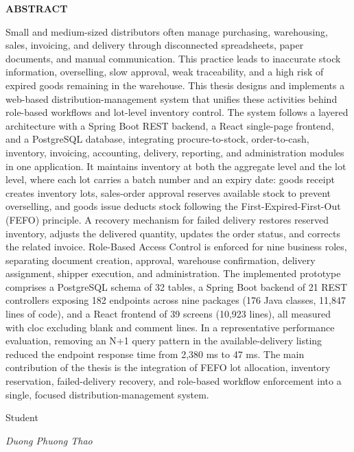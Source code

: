 \begin{center}\textbf{\large ABSTRACT}\end{center}


\noindent Small and medium-sized distributors often manage purchasing,
warehousing, sales, invoicing, and delivery through disconnected spreadsheets,
paper documents, and manual communication. This practice leads to inaccurate
stock information, overselling, slow approval, weak traceability, and a high
risk of expired goods remaining in the warehouse. This thesis designs and
implements a web-based distribution-management system that unifies these
activities behind role-based workflows and lot-level inventory control. The
system follows a layered architecture with a Spring Boot REST backend, a React
single-page frontend, and a PostgreSQL database, integrating procure-to-stock,
order-to-cash, inventory, invoicing, accounting, delivery, reporting, and
administration modules in one application. It maintains inventory at both the
aggregate level and the lot level, where each lot carries a batch number and an
expiry date: goods receipt creates inventory lots, sales-order approval reserves
available stock to prevent overselling, and goods issue deducts stock following
the First-Expired-First-Out (FEFO) principle. A recovery mechanism for failed
delivery restores reserved inventory, adjusts the delivered quantity, updates
the order status, and corrects the related invoice. Role-Based Access Control is
enforced for nine business roles, separating document creation, approval,
warehouse confirmation, delivery assignment, shipper execution, and
administration. The implemented prototype comprises a PostgreSQL schema of 32
tables, a Spring Boot backend of 21 REST controllers exposing 182 endpoints
across nine packages (176 Java classes, 11,847 lines of code), and a React
frontend of 39 screens (10,923 lines), all measured with cloc excluding blank
and comment lines. In a representative performance evaluation, removing an N+1
query pattern in the available-delivery listing reduced the endpoint response
time from 2,380 ms to 47 ms. The main contribution of the thesis is the
integration of FEFO lot allocation, inventory reservation, failed-delivery
recovery, and role-based workflow enforcement into a single, focused
distribution-management system.

\vspace{0.8cm}
\noindent Student

\hfill \textit{Duong Phuong Thao}
